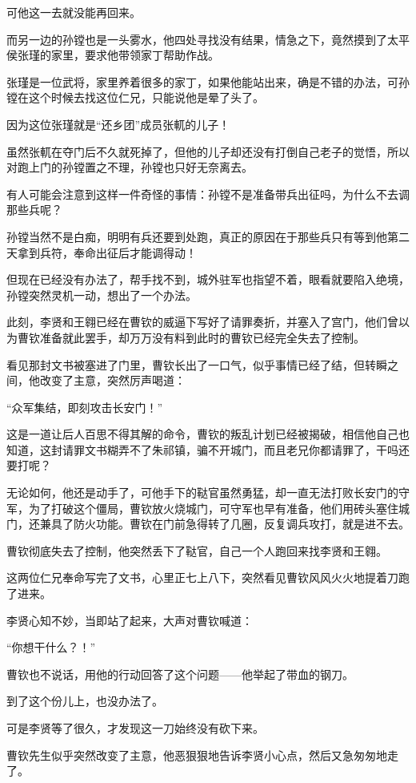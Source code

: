 \begin{multicols}{\theparacolNo}
		可他这一去就没能再回来。

		而另一边的孙镗也是一头雾水，他四处寻找没有结果，情急之下，竟然摸到了太平侯张瑾的家里，要求他带领家丁帮助作战。

		张瑾是一位武将，家里养着很多的家丁，如果他能站出来，确是不错的办法，可孙镗在这个时候去找这位仁兄，只能说他是晕了头了。

		因为这位张瑾就是“还乡团”成员张軏的儿子！

		虽然张軏在夺门后不久就死掉了，但他的儿子却还没有打倒自己老子的觉悟，所以对跑上门的孙镗置之不理，孙镗也只好无奈离去。

		有人可能会注意到这样一件奇怪的事情：孙镗不是准备带兵出征吗，为什么不去调那些兵呢？

		孙镗当然不是白痴，明明有兵还要到处跑，真正的原因在于那些兵只有等到他第二天拿到兵符，奉命出征后才能调得动！

		但现在已经没有办法了，帮手找不到，城外驻军也指望不着，眼看就要陷入绝境，孙镗突然灵机一动，想出了一个办法。

		此刻，李贤和王翱已经在曹钦的威逼下写好了请罪奏折，并塞入了宫门，他们曾以为曹钦准备就此罢手，却万万没有料到此时的曹钦已经完全失去了控制。

		看见那封文书被塞进了门里，曹钦长出了一口气，似乎事情已经了结，但转瞬之间，他改变了主意，突然厉声喝道：

		“众军集结，即刻攻击长安门！”

		这是一道让后人百思不得其解的命令，曹钦的叛乱计划已经被揭破，相信他自己也知道，这封请罪文书糊弄不了朱祁镇，骗不开城门，而且老兄你都请罪了，干吗还要打呢？

		无论如何，他还是动手了，可他手下的鞑官虽然勇猛，却一直无法打败长安门的守军，为了打破这个僵局，曹钦放火烧城门，可守军也早有准备，他们用砖头塞住城门，还兼具了防火功能。曹钦在门前急得转了几圈，反复调兵攻打，就是进不去。

		曹钦彻底失去了控制，他突然丢下了鞑官，自己一个人跑回来找李贤和王翱。

		这两位仁兄奉命写完了文书，心里正七上八下，突然看见曹钦风风火火地提着刀跑了进来。

		李贤心知不妙，当即站了起来，大声对曹钦喊道：

		“你想干什么？！”

		曹钦也不说话，用他的行动回答了这个问题——他举起了带血的钢刀。

		到了这个份儿上，也没办法了。

		可是李贤等了很久，才发现这一刀始终没有砍下来。

		曹钦先生似乎突然改变了主意，他恶狠狠地告诉李贤小心点，然后又急匆匆地走了。


\end{multicols}

